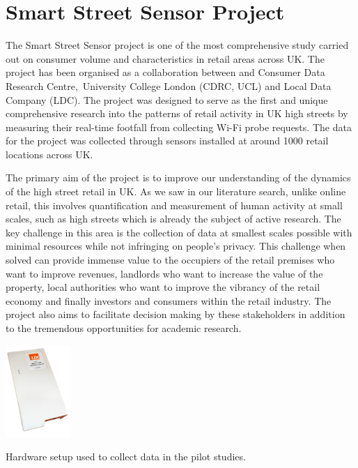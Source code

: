 \section{Smart Street Sensor Project}
The Smart Street Sensor project is one of the most comprehensive study carried out on consumer volume and characteristics in retail areas across UK.
The project has been organised as a collaboration between and Consumer Data Research Centre, University College London (CDRC, UCL) and Local Data Company (LDC).
The project was designed to serve as the first and unique comprehensive research into the patterns of retail activity in UK high streets by measuring their real-time footfall from collecting Wi-Fi probe requests.
The data for the project was collected through sensors installed at around 1000 retail locations across UK.

The primary aim of the project is to improve our understanding of the dynamics of the high street retail in UK.
As we saw in our literature search, unlike online retail, this involves quantification and measurement of human activity at small scales, such as high streets which is already the subject of active research.
The key challenge in this area is the collection of data at smallest scales possible with minimal resources while not infringing on people’s privacy.
This challenge when solved can provide immense value to the occupiers of the retail premises who want to improve revenues, landlords who want to increase the value of the property, local authorities who want to improve the vibrancy of the retail economy and finally investors and consumers within the retail industry.
The project also aims to facilitate decision making by these stakeholders in addition to the tremendous opportunities for academic research.

\begin{marginfigure}[-2cm]
  \centering
  \includegraphics[height=3.5cm]{images/sss-hardware.jpg}
  \caption{Hardware setup used to collect data in the pilot studies.}
  \label{figure:collection:sss:hardware}
\end{marginfigure}

